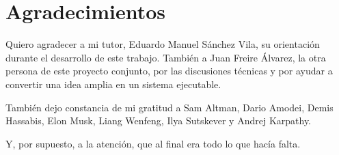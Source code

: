 \pagestyle{plain}
\chapter*{Agradecimientos}

Quiero agradecer a mi tutor, Eduardo Manuel Sánchez Vila, su orientación durante
el desarrollo de este trabajo. También a Juan Freire Álvarez, la otra persona de
este proyecto conjunto, por las discusiones técnicas y por ayudar a convertir una
idea amplia en un sistema ejecutable.

También dejo constancia de mi gratitud a Sam Altman, Dario Amodei, Demis
Hassabis, Elon Musk, Liang Wenfeng, Ilya Sutskever y Andrej Karpathy.

Y, por supuesto, a la atención, que al final era todo lo que hacía falta.
